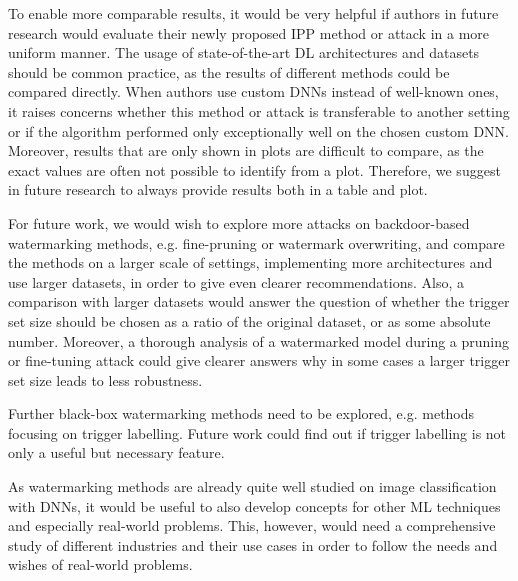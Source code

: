 To enable more comparable results, it would be very helpful if authors in future research would evaluate their newly proposed IPP method or attack in a more uniform manner. The usage of state-of-the-art DL architectures and datasets should be common practice, as the results of different methods could be compared directly. When authors use custom DNNs instead of well-known ones, it raises concerns whether this method or attack is transferable to another setting or if the algorithm performed only exceptionally well on the chosen custom DNN. Moreover, results that are only shown in plots are difficult to compare, as the exact values are often not possible to identify from a plot. Therefore, we suggest in future research to always provide results both in a table and plot.

For future work, we would wish to explore more attacks on backdoor-based watermarking methods, e.g. fine-pruning or watermark overwriting, and compare the methods on a larger scale of settings, implementing more architectures and use larger datasets, in order to give even clearer recommendations. Also, a comparison with larger datasets would answer the question of whether the trigger set size should be chosen as a ratio of the original dataset, or as some absolute number. Moreover, a thorough analysis of a watermarked model during a pruning or fine-tuning attack could give clearer answers why in some cases a larger trigger set size leads to less robustness.

Further black-box watermarking methods need to be explored, e.g. methods focusing on trigger labelling. Future work could find out if trigger labelling is not only a useful but necessary feature.

As watermarking methods are already quite well studied on image classification with DNNs, it would be useful to also develop concepts for other ML techniques and especially real-world problems. This, however, would need a comprehensive study of different industries and their use cases in order to follow the needs and wishes of real-world problems.
